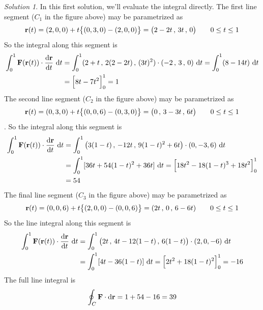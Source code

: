 \begin{eg}
\medskip
\noindent\textit{Solution 1}. 
In this first solution, we'll evaluate the integral directly.
The first line segment ($C_1$ in the figure above) may be parametrized as
\begin{equation*}
\mathbf{r}(t)=(2,0,0)+t\big\{(0, 3, 0)-(2,0,0)\big\}
=\big(2-2t\,,\,3t\,,\,0\big)\qquad 0\le t\le 1
\end{equation*} 
So the integral along this segment is
\begin{align*}
\int_0^1 \vF(\vr(t))\cdot\diff{\vr}{t}\ \dee{t}
&=\int_0^1 (2+t\,,\, 2(2-2t)\,,\, (3t)^2)\cdot(-2\,,\, 3\,,\, 0)\ \dee{t}
=\int_0^1 (8-14t)\ \dee{t} \\
&=\Big[8t-7t^2\Big]_0^1=1
\end{align*}
The second line segment ($C_2$ in the figure above) may be parametrized as
\begin{equation*}
\mathbf{r}(t)=(0,3,0)+t\big\{(0, 0, 6)-(0,3,0)\big\}
=\big(0\,,\,3-3t\,,\,6t\big)\qquad 0\le t\le 1
\end{equation*}. 
So the integral along this segment is
\begin{align*}
\int_0^1 \vF(\vr(t))\cdot\diff{\vr}{t}\ \dee{t}
&=\int_0^1 \big(3(1-t)\,,\, - 12t\,,\, 9(1-t)^2+ 6t\big)\cdot(0, -3, 6)\ \dee{t}
\\
&=\int_0^1 [36t+54(1-t)^2+36t]\ \dee{t}
=\Big[18t^2-18(1-t)^3+18t^2\Big]_0^1
\\
&=54
\end{align*}
The final line segment ($C_3$ in the figure above) may be parametrized as
\begin{equation*}
\mathbf{r}(t)=(0,0,6)+t\big\{(2,0,0) -(0,0,6)\big\} = (2t\,,\,0\,,\,6-6t)
\qquad 0\le t\le 1
\end{equation*}
So the line integral along this segment is
\begin{align*}
\int_0^1 \vF(\vr(t))\cdot\diff{\vr}{t}\ \dee{t}
&=\int_0^1 \big(2t\,,\, 4t - 12(1-t)\,,\,  6(1-t)\big)\cdot(2, 0, -6)\ \dee{t}
\\
&=\int_0^1 [4t-36(1-t)]\ \dee{t}
=\Big[2t^2+18(1-t)^2\Big]_0^1
=-16
\end{align*}
The full line integral is
\begin{equation*}
\oint_C\mathbf{F}\cdot \mathrm{d}\mathbf{r}=1+54-16=39
\end{equation*}



\end{eg}
